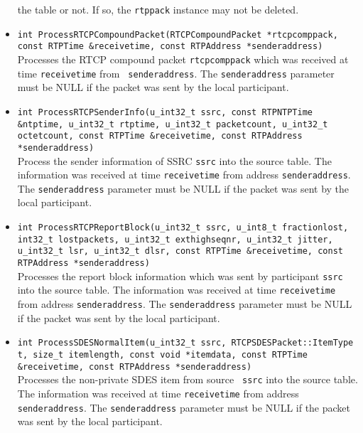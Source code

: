 \documentclass[12pt,a4paper]{article}
\begin{document}
\begin{itemize}
						the table or not. If so, the {\tt rtppack} instance may not
						be deleted.
					\item {\tt int ProcessRTCPCompoundPacket(RTCPCompoundPacket *rtcpcomppack, const RTPTime \&receivetime,
					                                         const RTPAddress *senderaddress)}\\
						Processes the RTCP compound packet {\tt rtcpcomppack}
						which was received at time {\tt receivetime} from {\tt
						senderaddress}. The {\tt senderaddress} parameter must
						be NULL if the packet was sent by the local participant.
					\item {\tt int ProcessRTCPSenderInfo(u\_int32\_t ssrc, const RTPNTPTime \&ntptime, u\_int32\_t rtptime,
					                                     u\_int32\_t packetcount, u\_int32\_t octetcount, const RTPTime \&receivetime,
					                                     const RTPAddress *senderaddress)}\\
						Process the sender information of SSRC {\tt ssrc} into
						the source table. The information was received at time
						{\tt receivetime} from address {\tt senderaddress}. The
						{\tt senderaddress} parameter must be NULL if the packet
						was sent by the local participant.
					\item {\tt int ProcessRTCPReportBlock(u\_int32\_t ssrc, u\_int8\_t fractionlost, int32\_t lostpackets,
					                                      u\_int32\_t exthighseqnr, u\_int32\_t jitter, u\_int32\_t lsr,
					                                      u\_int32\_t dlsr, const RTPTime \&receivetime, const RTPAddress *senderaddress)}\\
						Processes the report block information which was sent
						by participant {\tt ssrc} into the source table. The
						information was received at time {\tt receivetime} from
						address {\tt senderaddress}. The {\tt senderaddress}
						parameter must be NULL if the packet was sent by the
						local participant.
					\item {\tt int ProcessSDESNormalItem(u\_int32\_t ssrc, RTCPSDESPacket::ItemType t, size\_t itemlength,
					                                     const void *itemdata, const RTPTime \&receivetime, const RTPAddress *senderaddress)}\\
						Processes the non-private SDES item from source {\tt
						ssrc} into the source table. The information was
						received at time {\tt receivetime} from address {\tt
						senderaddress}. The {\tt senderaddress} parameter must
						be NULL if the packet was sent by the local participant.

\end{itemize}
\end{document}
